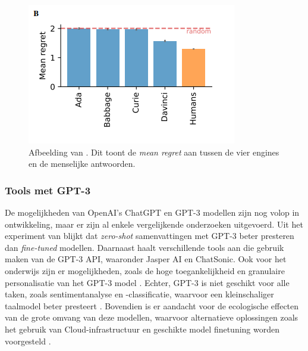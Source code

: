 \begin{figure}
	\begin{center}
		\includegraphics{img/chatgpt-engines-mean-regret.png}
		\caption{Afbeelding van \textcite{Binz2023}. Dit toont de \textit{mean regret} aan tussen de vier engines en de menselijke antwoorden.}
	\end{center}
\end{figure}

\subsubsection{Tools met GPT-3}

De mogelijkheden van OpenAI's ChatGPT en GPT-3 modellen zijn nog volop in ontwikkeling, maar er zijn al enkele vergelijkende onderzoeken uitgevoerd. Uit het experiment van \textcite{Goyal2022} blijkt dat \textit{zero-shot} samenvattingen met GPT-3 beter presteren dan \textit{fine-tuned} modellen. Daarnaast haalt \textcite{Mottesi2023} verschillende tools aan die gebruik maken van de GPT-3 API, waaronder Jasper AI en ChatSonic. Ook voor het onderwijs zijn er mogelijkheden, zoals de hoge toegankelijkheid en granulaire personalisatie van het GPT-3 model \autocite{Roose2023, Garg2022}. Echter, GPT-3 is niet geschikt voor alle taken, zoals sentimentanalyse en -classificatie, waarvoor een kleinschaliger taalmodel beter presteert \autocite{Li2022}. Bovendien is er aandacht voor de ecologische effecten van de grote omvang van deze modellen, waarvoor alternatieve oplossingen zoals het gebruik van Cloud-infrastructuur en geschikte model finetuning worden voorgesteld \autocite{Strubell2019, Simon2021}.


